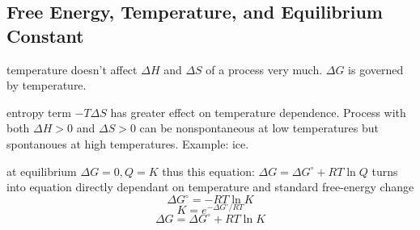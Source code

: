 \begin{mdframed}
\begin{multicols}{2}
\subsection{Free Energy, Temperature, and Equilibrium Constant}
\begin{compactdesc}
    \item[temperature doesn't affect] $\Delta H$ and $\Delta S$ of a process
        very much. $\Delta G$ is governed by temperature.
    \item[entropy term $-T\Delta S$] has greater effect on temperature
        dependence. Process with both $\Delta H > 0$ and $\Delta S > 0$ can
        be nonspontaneous at low temperatures but spontanoues at high
        temperatures. Example: ice.
    \item[at equilibrium] $\Delta G = 0, Q = K$ thus this equation:
        $\Delta G = \Delta G^\circ + RT\ln Q$ turns into equation directly
        dependant on temperature and standard free-energy change
        \[
            \Delta G^\circ = -RT\ln K
        \]
        \[
            K = e^{- \Delta G^\circ / RT}
        \]
        \[
            \Delta G = \Delta G^\circ + RT\ln K
        \]
\end{compactdesc}
\end{multicols}
\end{mdframed}







